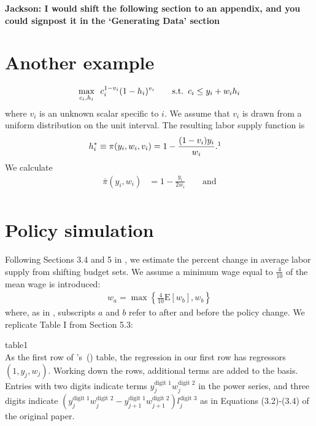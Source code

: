 \documentclass[11pt,letterpaper]{article}                  %
\newcommand\citepos[1]{\citeauthor{#1}'s\ (\citeyear{#1})}
\begin{document}
\textbf{Jackson: I would shift the following section to an appendix, and you could signpost
  it in the `Generating Data' section}
\section{Another example}
\label{sec:ex2}

\begin{align*}
	\max_{c_i, h_i} \enskip c_i^{1-v_i} (1-h_i)^{v_i} \qquad \text{s.t.} \enskip c_i \leq y_i + w_i h_i
\end{align*}
where $v_i$ is an unknown scalar specific to $i$.
We assume that $v_i$ is drawn from a uniform distribution on the unit interval.
The resulting labor supply function is
\begin{align*}
	h^*_i &\equiv \pi (y_i, w_i, v_i) = 1 - \frac{(1-v_i) y_i}{w_i}.\footnotemark
\end{align*}
We calculate
\begin{align*}
	\bar{\pi} (y_i, w_i) &= 1 - \frac{y_i}{2 w_i} \qquad \text{and} \\
\end{align*}



\section{Policy simulation}
\label{sec:policy}

Following Sections 3.4 and 5 in \citet{Blomquist2002}, we estimate the percent change in average labor supply from shifting budget sets.
We assume a minimum wage equal to $\tfrac{4}{10}$ of the mean wage is introduced:
\begin{align*}
  w_a = \max\left\{\tfrac{4}{10} \mathrm{E}[w_b], w_b\right\}
\end{align*}
where, as in \citet{Blomquist2002}, subscripts $a$ and $b$ refer to after and before the policy change.
We replicate Table I from Section 5.3:

 {table1} \mbox{} \\

As the first row of \citepos{Blomquist2002} table, the regression in our first row has regressors $(1,y_j,w_j)$.
Working down the rows, additional terms are added to the basis.
Entries with two digits indicate terms $y_j^{\text{digit }1}w_j^{\text{digit }2}$ in the power series, and three digits indicate $(y_{j}^{\text{digit }1}w_j^{\text{digit }2} -
y_{j+1}^{\text{digit }1}w_{j+1}^{\text{digit }2})l_j^{\text{digit }3}$ as in Equations (3.2)-(3.4) of the original paper.
\end{document}
